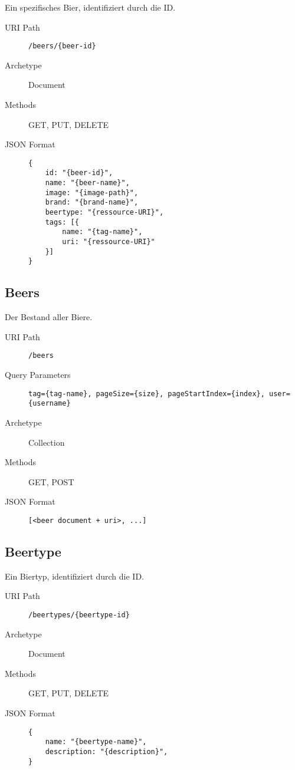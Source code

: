 \documentclass[10pt,a4paper]{scrartcl}
\begin{document}
Ein spezifisches Bier, identifiziert durch die ID.

\begin{description}
	\item[URI Path] \texttt{/beers/\{beer-id\}}
	\item[Archetype] Document
	\item[Methods] GET, PUT, DELETE
	\item[JSON Format] \hfill
\begin{lstlisting}
{	
	id: "{beer-id}",
	name: "{beer-name}",
	image: "{image-path}",
	brand: "{brand-name}",
	beertype: "{ressource-URI}",
	tags: [{
		name: "{tag-name}",
		uri: "{ressource-URI}"
	}]
}
\end{lstlisting}
\end{description}


\subsection{Beers}

Der Bestand aller Biere.

\begin{description}
	\item[URI Path] \texttt{/beers}
 	\item[Query Parameters] \texttt{tag=\{tag-name\}, pageSize=\{size\}, pageStartIndex=\{index\}, user=\{username\}}
	\item[Archetype] Collection
	\item[Methods] GET, POST
	\item[JSON Format] \hfill
\begin{lstlisting}
[<beer document + uri>, ...]
\end{lstlisting}
\end{description}


\subsection{Beertype}

Ein Biertyp, identifiziert durch die ID.

\begin{description}
	\item[URI Path] \texttt{/beertypes/\{beertype-id\}}
	\item[Archetype] Document
	\item[Methods] GET, PUT, DELETE
	\item[JSON Format] \hfill
\begin{lstlisting}
{
	name: "{beertype-name}",
	description: "{description}",
}
\end{lstlisting}
\end{description}
\end{document}

